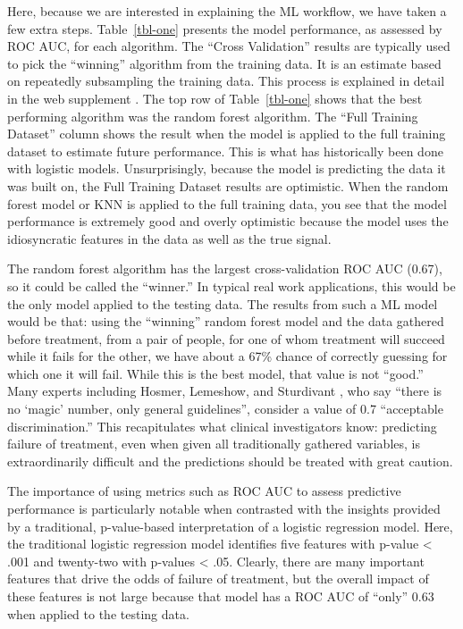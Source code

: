 \documentclass[
  number,
  preprint,
  3p,
  onecolumn]{elsarticle}
\begin{document}
Here, because we are interested in explaining the ML workflow, we have
taken a few extra steps. Table~\ref{tbl-one} presents the model
performance, as assessed by ROC AUC, for each algorithm. The ``Cross
Validation'' results are typically used to pick the ``winning''
algorithm from the training data. It is an estimate based on repeatedly
subsampling the training data. This process is explained in detail in
the web supplement \citep{balise_supplement_2025}. The top row of
Table~\ref{tbl-one} shows that the best performing algorithm was the
random forest algorithm. The ``Full Training Dataset'' column shows the
result when the model is applied to the full training dataset to
estimate future performance. This is what has historically been done
with logistic models. Unsurprisingly, because the model is predicting
the data it was built on, the Full Training Dataset results are
optimistic. When the random forest model or KNN is applied to the full
training data, you see that the model performance is extremely good and
overly optimistic because the model uses the idiosyncratic features in
the data as well as the true signal.

The random forest algorithm has the largest cross-validation ROC AUC
(0.67), so it could be called the ``winner.'' In typical real work
applications, this would be the only model applied to the testing data.
The results from such a ML model would be that: using the ``winning''
random forest model and the data gathered before treatment, from a pair
of people, for one of whom treatment will succeed while it fails for the
other, we have about a 67\% chance of correctly guessing for which one
it will fail. While this is the best model, that value is not ``good.''
Many experts including Hosmer, Lemeshow, and Sturdivant
\citep{hosmer2013}, who say ``there is no `magic' number, only general
guidelines'', consider a value of 0.7 ``acceptable discrimination.''
This recapitulates what clinical investigators know: predicting failure
of treatment, even when given all traditionally gathered variables, is
extraordinarily difficult and the predictions should be treated with
great caution.

The importance of using metrics such as ROC AUC to assess predictive
performance is particularly notable when contrasted with the insights
provided by a traditional, p-value-based interpretation of a logistic
regression model. Here, the traditional logistic regression model
identifies five features with p-value \textless{} .001 and twenty-two
with p-values \textless{} .05. Clearly, there are many important
features that drive the odds of failure of treatment, but the overall
impact of these features is not large because that model has a ROC AUC
of ``only'' 0.63 when applied to the testing data.
\end{document}
